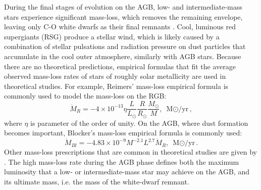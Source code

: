 During the final stages of evolution on the AGB, low- and intermediate-mass stars experience significant mass-loss, which removes the remaining envelope, leaving only C-O white dwarfs as their final remnants \citep{marigo2007evolution, pols2011stellar}. Cool, luminous red supergiants (RSG) produce a stellar wind, which is likely caused by a combination of stellar pulsations and radiation pressure on dust particles that accumulate in the cool outer atmosphere, similarly with AGB stars. Because there are no theoretical predictions, empirical formulas that fit the average observed mass-loss rates of stars of roughly solar metallicity are used in theoretical studies. For example, Reimers' mass-loss empirical formula \citep{reimers1975circumstellar} is commonly used to model the mass-loss on the RGB:
\begin{equation}\label{eq:reimer}
    \dot{M}_{R} = -4 \times 10^{-13} \eta 
    \frac{L}{L_{\odot}}  \frac{R}{R_{\odot}} \frac{M_{\odot}}{M},
    \text{ M${\odot}$/yr},
\end{equation}
where $\eta$ is parameter of the order of unity. On the AGB, where dust formation becomes important, Blocker's mass-loss empirical formula \citep{bloecker1995stellarI,bloecker1995stellarII} is commonly used:
\begin{equation}\label{eq:blocker}
    \dot{M}_{Bl} = -4.83 \times 10^{-9} M^{-2.1} L^{2.7} \dot{M}_{R},
    \text{ M${\odot}$/yr}.
\end{equation}
Other mass-loss prescriptions that are common in theoretical studies are given by \cite{de1988mass,nieuwenhuijzen1990parametrization}. The high mass-loss rate during the AGB phase defines both the maximum luminosity that a low- or intermediate-mass star may achieve on the AGB, and its ultimate mass, i.e. the mass of the white-dwarf remnant.

